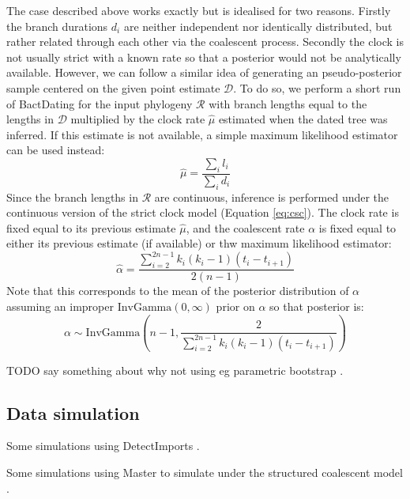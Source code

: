 \documentclass{article}
\begin{document}
The case described above works exactly but is idealised for two reasons.
Firstly the branch durations $d_i$ are neither independent nor identically distributed,
but rather related through each other via the coalescent process. Secondly
the clock is not usually strict with a known rate so that
a posterior would not be analytically available. 
However, we can follow
a similar idea of generating an pseudo-posterior sample centered on the given
point estimate $\mathcal{D}$. To do so, we perform a short run of BactDating \citep{Didelot2018}
for the input phylogeny $\mathcal{R}$ 
with branch lengths equal to
the lengths in $\mathcal{D}$ multiplied by the clock rate 
$\hat \mu$ estimated when the dated tree was inferred. 
If this estimate is not available, a simple maximum likelihood
estimator can be used instead: 
\begin{equation}
\hat \mu = \frac{\sum_i l_i}{\sum_i d_i}
\end{equation}
Since the branch lengths in $\mathcal{R}$ are continuous, 
inference is performed under the 
continuous version of the strict clock model (Equation \ref{eq:csc}).  
The clock rate is fixed equal to its previous estimate $\hat \mu$, and the coalescent rate $\alpha$
is fixed equal to either its previous estimate (if available) or
thw maximum likelihood estimator:
\begin{equation}
\hat \alpha = \frac{\sum_{i=2}^{2n-1}k_i (k_i-1)(t_i-t_{i+1})}{2(n-1)}
\end{equation}
Note that this corresponds to the mean of the posterior distribution of $\alpha$ 
assuming an improper $\mathrm{InvGamma}(0,\infty)$ prior on $\alpha$ so that posterior is:
\begin{equation}
\alpha \sim \mathrm{InvGamma}\left(n-1, \frac{2}{\sum_{i=2}^{2n-1}k_i (k_i-1)(t_i-t_{i+1})}\right)
\end{equation}

TODO say something about why not using eg 
parametric bootstrap \citep{efronBayesianInferenceParametric2012}.

\subsection*{Data simulation}

Some simulations using DetectImports \citep{Didelot2022detectimports}.

Some simulations using Master \citep{Vaughan2013} to simulate under the structured coalescent model \citep{Nordborg1997}.
\end{document}
